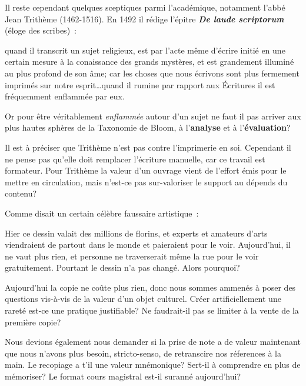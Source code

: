 Il reste cependant quelques sceptiques parmi l'académique, notamment l'abbé Jean Trithème (1462-1516). En 1492 il rédige l'épitre \textbf{\emph{De laude scriptorum}} (éloge des scribes)~:

\begin{coolquote} quand il transcrit un sujet religieux, est par l'acte même d'écrire initié en une certain mesure à la conaissance des grands mystères, et est grandement illuminé au plus profond de son âme; car les choses que nous écrivons sont plus fermement imprimés sur notre esprit\ldots quand il rumine par rapport aux Écritures il est fréquemment enflammée par eux.
\end{coolquote}

Or pour être véritablement \emph{enflammée} autour d'un sujet ne faut il pas arriver aux plus hautes sphères de la Taxonomie de Bloom, à l'\textbf{analyse} et à l'\textbf{évaluation}?

Il est à préciser que Trithème n'est pas contre l'imprimerie en soi. Cependant il ne pense pas qu'elle doit remplacer l'écriture manuelle, car ce travail est formateur\cite{abbot-trithemius}. Pour Trithème la valeur d'un ouvrage vient de l'effort émis pour le mettre en circulation, mais n'est-ce pas sur-valoriser le support au dépends du contenu?

Comme disait un certain célèbre faussaire artistique~: 

\begin{coolquote}
Hier ce dessin valait des millions de florins, et experts et amateurs d'arts viendraient de partout dans le monde et paieraient pour le voir. Aujourd'hui, il ne vaut plus rien, et personne ne traverserait même la rue pour le voir gratuitement. Pourtant le dessin n'a pas changé. Alors pourquoi?
\end{coolquote}

Aujourd'hui la copie ne coûte plus rien, donc nous sommes ammenés à poser des questions vis-à-vis de la valeur d'un objet culturel. Créer artificiellement une rareté est-ce une pratique justifiable? Ne faudrait-il pas se limiter à la vente de la première copie? 

Nous devions également nous demander si la prise de note a de valeur maintenant que nous n'avons plus besoin, stricto-senso, de retranscire nos réferences à la main. Le recopiage a t'il une valeur mnémonique? Sert-il à comprendre en plus de mémoriser? Le format cours magistral est-il suranné aujourd'hui?  

